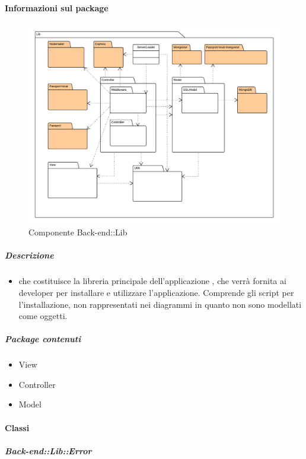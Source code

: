   \paragraph{Informazioni sul package} 
    \begin{figure}[H] 
      \begin{center} 
        \includegraphics[width=\textwidth]{uml/package/Back-end::Lib.png}  
        \caption{Componente Back-end::Lib}
      \end{center}  
    \end{figure} 
  \subparagraph{Descrizione} 
    \begin{itemize}
    \item[]  che costituisce la libreria principale dell’applicazione , che verrà fornita ai
developer per installare e utilizzare l’applicazione. Comprende gli script per l’installazione,
non rappresentati nei diagrammi in quanto non sono modellati come oggetti.

    \end{itemize} 
    \subparagraph{Package contenuti} 
    \begin{itemize}
        \item View
        \item Controller
        \item Model
    \end{itemize}
    \paragraph{Classi}
      \subparagraph{Back-end::Lib::Error}
        
